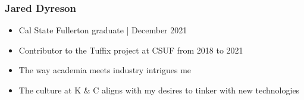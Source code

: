 \documentclass{beamer}
\begin{document}
\begin{frame}[fragile]
\frametitle{Jared Dyreson}
\begin{itemize}
		\item Cal State Fullerton graduate | December 2021
		\item Contributor to the Tuffix project at CSUF from 2018 to 2021
		\item The way academia meets industry intrigues me
		\item The culture at K \& C aligns with my desires to tinker with new technologies
\end{itemize}





\end{frame}
\end{document}
